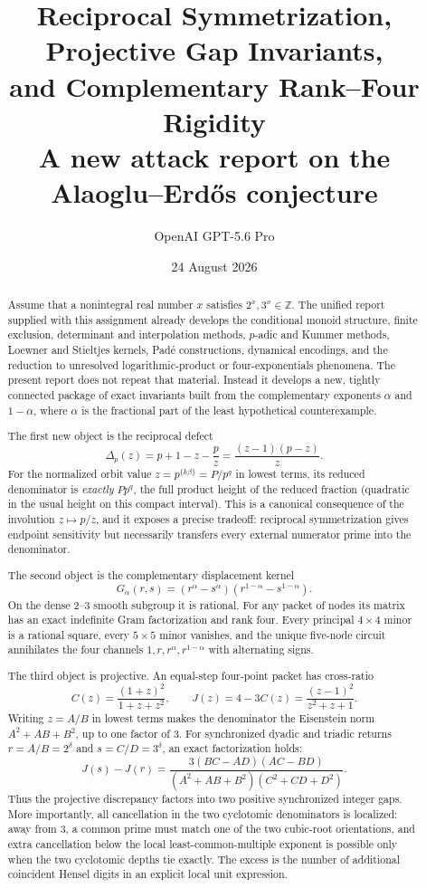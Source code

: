 \documentclass[11pt]{article}
\title{\bfseries Reciprocal Symmetrization, Projective Gap Invariants,\\
and Complementary Rank--Four Rigidity\\[4pt]
\large A new attack report on the Alaoglu--Erd\H{o}s conjecture}
\author{OpenAI GPT-5.6 Pro}
\date{24 August 2026}
\theoremstyle{definition}
\theoremstyle{remark}
\newcommand{\Z}{\mathbb{Z}}
\begin{document}
\maketitle

\begin{abstract}
Assume that a nonintegral real number $x$ satisfies $2^x,3^x\in\Z$.  The unified report supplied with this assignment already develops the conditional monoid structure, finite exclusion, determinant and interpolation methods, $p$-adic and Kummer methods, Loewner and Stieltjes kernels, Pad\'e constructions, dynamical encodings, and the reduction to unresolved logarithmic-product or four-exponentials phenomena.  The present report does not repeat that material.  Instead it develops a new, tightly connected package of exact invariants built from the complementary exponents $\alpha$ and $1-\alpha$, where $\alpha$ is the fractional part of the least hypothetical counterexample.

The first new object is the reciprocal defect
\[
 \Delta_p(z)=p+1-z-\frac pz=\frac{(z-1)(p-z)}z.
\]
For the normalized orbit value $z=p^{\{k\beta\}}=P/p^q$ in lowest terms, its reduced denominator is \emph{exactly} $Pp^q$, the full product height of the reduced fraction (quadratic in the usual height on this compact interval).  This is a canonical consequence of the involution $z\mapsto p/z$, and it exposes a precise tradeoff: reciprocal symmetrization gives endpoint sensitivity but necessarily transfers every external numerator prime into the denominator.

The second object is the complementary displacement kernel
\[
 G_\alpha(r,s)=(r^\alpha-s^\alpha)(r^{1-\alpha}-s^{1-\alpha}).
\]
On the dense $2$--$3$ smooth subgroup it is rational.  For any packet of nodes its matrix has an exact indefinite Gram factorization and rank four.  Every principal $4\times4$ minor is a rational square, every $5\times5$ minor vanishes, and the unique five-node circuit annihilates the four channels $1,r,r^\alpha,r^{1-\alpha}$ with alternating signs.

The third object is projective.  An equal-step four-point packet has cross-ratio
\[
 C(z)=\frac{(1+z)^2}{1+z+z^2},\qquad
 J(z)=4-3C(z)=\frac{(z-1)^2}{z^2+z+1}.
\]
Writing $z=A/B$ in lowest terms makes the denominator the Eisenstein norm $A^2+AB+B^2$, up to one factor of $3$.  For synchronized dyadic and triadic returns $r=A/B=2^\delta$ and $s=C/D=3^\delta$, an exact factorization holds:
\[
 J(s)-J(r)
 =\frac{3(BC-AD)(AC-BD)}{(A^2+AB+B^2)(C^2+CD+D^2)}.
\]
Thus the projective discrepancy factors into two positive synchronized integer gaps.  More importantly, all cancellation in the two cyclotomic denominators is localized: away from $3$, a common prime must match one of the two cubic-root orientations, and extra cancellation below the local least-common-multiple exponent is possible only when the two cyclotomic depths tie exactly.  The excess is the number of additional coincident Hensel digits in an explicit local unit expression.


\end{abstract}
\end{document}
